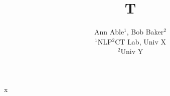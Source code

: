 \documentclass{article}
\begin{document}
\title{T}
\author{Ann Able$^1$, Bob Baker$^2$ \\
$^1$NLP$^2$CT Lab, Univ X \\
$^2$Univ Y}
\maketitle
x
\end{document}
